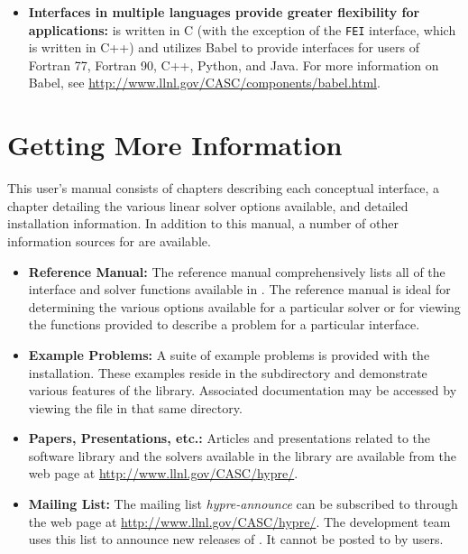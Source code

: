 \begin{itemize}
\item
{\bf Interfaces in multiple languages provide greater flexibility for
applications:} \hypre{} is written in C (with the exception of the {\tt FEI}
interface, which is written in C++) and utilizes Babel to provide
interfaces for users of Fortran 77, Fortran 90, C++, Python, and Java.
For more information on Babel, see
\url{http://www.llnl.gov/CASC/components/babel.html}.

\end{itemize}




\section{Getting More Information}

This user's manual consists of chapters describing each conceptual interface, a
chapter detailing the various linear solver options available, and detailed
installation information.  In addition to this manual, a number of other
information sources for \hypre{} are available.

\begin{itemize}

\item
{\bf Reference Manual:} The reference manual comprehensively lists all of the
interface and solver functions available in \hypre{}.  The reference manual is
ideal for determining the various options available for a particular solver or
for viewing the functions provided to describe a problem for a particular
interface.

\item{\bf Example Problems:} A suite of example problems is provided with the
\hypre{} installation.  These examples reside in the 
subdirectory and demonstrate various features of the \hypre{} library.
Associated documentation may be accessed by viewing the  file
in that same directory.

\item
{\bf Papers, Presentations, etc.:} Articles and presentations related to the
\hypre{} software library and the solvers available in the library are available
from the \hypre{} web page at \url{http://www.llnl.gov/CASC/hypre/}.

\item{\bf Mailing List:} The mailing list {\sl hypre-announce} can be subscribed
to through the \hypre{} web page at \url{http://www.llnl.gov/CASC/hypre/}.  The
development team uses this list to announce new releases of \hypre{}.  It cannot
be posted to by users.

\end{itemize}

